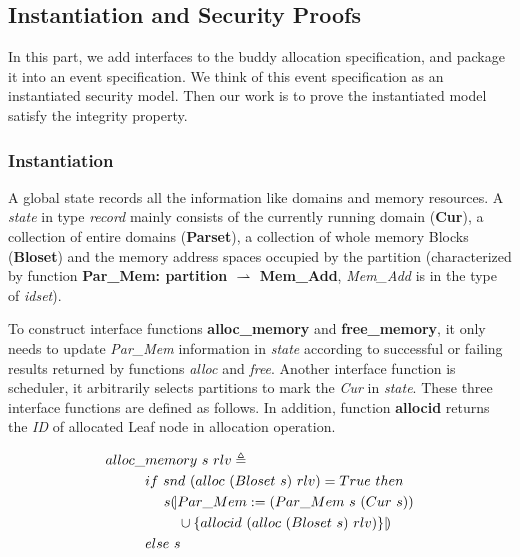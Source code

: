 \subsection{Instantiation and Security Proofs}\label{sec:securityproof}
In this part, we add interfaces to the buddy allocation specification, and package it into an event specification. We think of this event specification as an instantiated security model. Then our work is to prove the instantiated model satisfy the integrity property.

\subsubsection{Instantiation}
A global state records all the information like domains and memory resources. A \emph{state} in type \emph{record} mainly consists of the currently running domain (\textbf{Cur}), a collection of entire domains (\textbf{Parset}), a collection of whole memory Blocks (\textbf{Bloset}) and the memory address spaces occupied by the partition (characterized by function \textbf{Par\_Mem: partition $\rightharpoonup$ Mem\_Add}, \emph{Mem\_Add} is in the type of \emph{idset}).

To construct interface functions \textbf{alloc\_memory} and \textbf{free\_memory}, it only needs to update \emph{Par\_Mem} information in \emph{state} according to successful or failing results returned by functions \emph{alloc} and \emph{free}. Another interface function is scheduler, it arbitrarily selects partitions to mark the \emph{Cur} in \emph{state}. These three interface functions are defined as follows. In addition, function \textbf{allocid} returns the \emph{ID} of allocated Leaf node in allocation operation.

\begin{definition} 
\vspace{-7pt}
\end{definition}
{\footnotesize
\begin{align*}
alloc\_&memory\ s\ rlv \triangleq \\
&if\ snd\ (alloc\ (Bloset\ s)\ rlv) = True\ then \\
&\ \ \ \ s{\emph{$\mathopen{(\mkern-3mu\mid}$}} Par\_Mem := (Par\_Mem\ s\ (Cur\ s)) \\
&\ \ \ \ \ \ \ \cup \lbrace allocid\ (alloc\ (Bloset\ s)\ rlv) \rbrace {\emph{$\mathclose{\mid\mkern-3mu)}$}} \\
&else\ s
\end{align*}
}
\vspace{-12pt}

